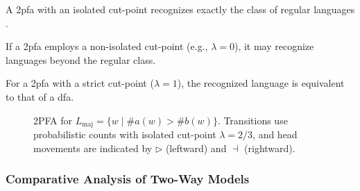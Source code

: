 \begin{theorem}
    \label{thm:2pfa-rabin}
    A \gls{2pfa} with an isolated cut-point recognizes exactly the class of regular languages \cite{dwork1990time}.
\end{theorem}

\begin{proposition}
If a \gls{2pfa} employs a non-isolated cut-point (e.g., \(\lambda = 0\)), it may recognize languages beyond the regular class.
\end{proposition}

\begin{corollary}
For a \gls{2pfa} with a strict cut-point (\(\lambda = 1\)), the recognized language is equivalent to that of a \gls{dfa}.
\end{corollary}

\begin{figure}[h]
    \centering  
    \caption{2PFA for \(L_{\text{maj}} = \{w \mid \#a(w) > \#b(w)\}\). Transitions use probabilistic counts with isolated cut-point \(\lambda = 2/3\), and head movements are indicated by \(\triangleright\) (leftward) and \(\dashv\) (rightward).}
    \label{fig:2pfa-example}
\end{figure}


\subsubsection{Comparative Analysis of Two-Way Models}
\label{subsubsec:two-way-comparison}

